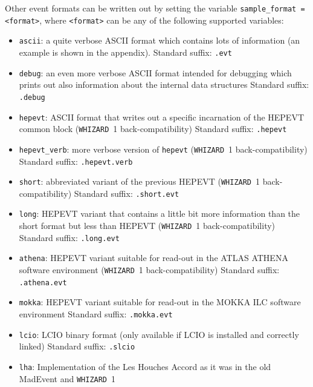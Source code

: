 \documentclass[12pt]{book}
\newcommand{\ttt}[1]{\texttt{#1}}
\newcommand{\whizard}{\ttt{WHIZARD}}
\begin{document}
Other event formats can be written out by setting the variable
\ttt{sample\_format = <format>}, where \ttt{<format>} can be any of
the following supported variables:
\begin{itemize}
\item \ttt{ascii}: a quite verbose ASCII format which contains lots of
  information (an example is shown in the appendix). \newline
  Standard suffix: \ttt{.evt}
\item \ttt{debug}: an even more verbose ASCII format intended for
  debugging which prints out also information about the internal data
  structures \newline
  Standard suffix: \ttt{.debug}
\item \ttt{hepevt}: ASCII format that writes out a specific
  incarnation of the HEPEVT common block (\whizard~1
  back-compatibility) \newline
  Standard suffix: \ttt{.hepevt}
\item \ttt{hepevt\_verb}: more verbose version of \ttt{hepevt} (\whizard~1
  back-compatibility) \newline
  Standard suffix: \ttt{.hepevt.verb}
\item \ttt{short}: abbreviated variant of the previous HEPEVT (\whizard\
  1 back-compatibility)  \newline
  Standard suffix: \ttt{.short.evt}
\item \ttt{long}: HEPEVT variant that contains a little bit more
  information than the short format but less than HEPEVT (\whizard\
  1 back-compatibility)  \newline
  Standard suffix: \ttt{.long.evt}
\item \ttt{athena}: HEPEVT variant suitable for read-out in the ATLAS
  ATHENA software environment (\whizard\
  1 back-compatibility)  \newline
  Standard suffix: \ttt{.athena.evt}
\item \ttt{mokka}: HEPEVT variant suitable for read-out in the MOKKA
  ILC software environment \newline
  Standard suffix: \ttt{.mokka.evt}
\item \ttt{lcio}: LCIO binary format (only available if LCIO is
  installed and correctly linked) \newline
  Standard suffix: \ttt{.slcio}
\item \ttt{lha}: Implementation of the Les Houches Accord as it was in
  the old MadEvent and \whizard~1 \newline

\end{itemize}
\end{document}
